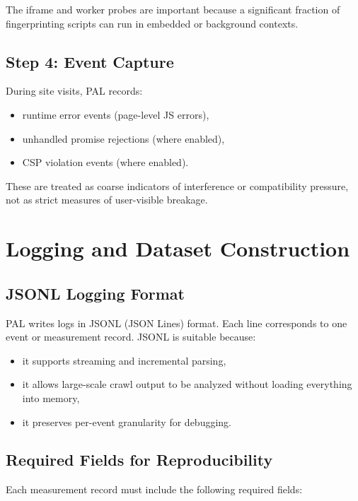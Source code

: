 \documentclass[11pt]{report}
\begin{document}
The iframe and worker probes are important because a significant fraction of fingerprinting scripts can run in embedded or background contexts.

\subsection{Step 4: Event Capture}

During site visits, PAL records:

\begin{itemize}
    \item runtime error events (page-level JS errors),
    \item unhandled promise rejections (where enabled),
    \item CSP violation events (where enabled).
\end{itemize}

These are treated as coarse indicators of interference or compatibility pressure, not as strict measures of user-visible breakage.

\section{Logging and Dataset Construction}

\subsection{JSONL Logging Format}

PAL writes logs in JSONL (JSON Lines) format. Each line corresponds to one event or measurement record. JSONL is suitable because:

\begin{itemize}
    \item it supports streaming and incremental parsing,
    \item it allows large-scale crawl output to be analyzed without loading everything into memory,
    \item it preserves per-event granularity for debugging.
\end{itemize}

\subsection{Required Fields for Reproducibility}

Each measurement record must include the following required fields:
\end{document}
